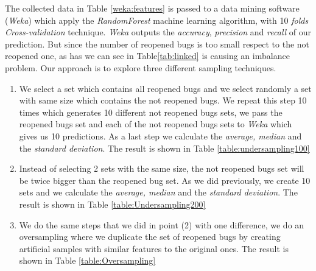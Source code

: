 \documentclass[sigconf,review]{acmart}
\begin{document}
The collected data in Table \ref{weka:features} is passed to a data mining software (\emph{Weka}) which apply the \emph{RandomForest} machine learning algorithm, with 10 \emph{folds Cross-validation} technique.
\emph{Weka} outputs the \emph{accuracy}, \emph{precision} and \emph{recall} of our prediction. But since the number of reopened bugs is too small respect to the not reopened one, as has we can see in Table\ref{tab:linked} is causing an imbalance problem. Our approach is to explore three different sampling techniques.
\begin{enumerate}
\item {We select a set which contains all reopened bugs and we select randomly a set with same size which contains the not reopened bugs. We repeat this step 10 times which generates  10 different not reopened bugs sets, we pass the reopened bugs set and each of the not reopened bugs sets to \emph{Weka} which gives us 10 predictions. As a last step we calculate the \emph{average, median} and the \emph{standard deviation}. The result is shown in Table \ref{table:undersampling100}} 

\item{Instead of selecting 2 sets with the same size, the not reopened bugs set will be twice bigger than the reopened bug set. As we did previously, we create 10 sets and we calculate the \emph{average, median} and the \emph{standard deviation}. The result is shown in Table \ref{table:Undersampling200}}

\item{We do the same steps that we did in point (2) with one difference, we do an oversampling where we duplicate the set of reopened bugs by creating artificial samples with similar features to the original ones. The result is shown in Table \ref{table:Oversampling}} 
\end{enumerate}
\end{document}
